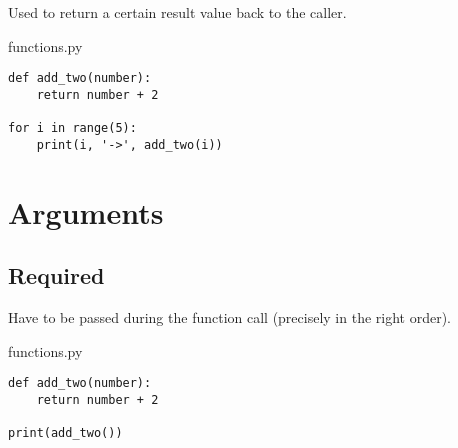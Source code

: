\documentclass[aspectratio=1610,slidestop]{beamer}
\begin{document}
\begin{pframe}
 Used to return a certain result value back to the caller.
 \medskip

 \begin{minipage}[t]{0.47\textwidth}
  \begin{pythonfile}{functions.py}
   \begin{verbatim}
def add_two(number):
    return number + 2

for i in range(5):
    print(i, '->', add_two(i))
   \end{verbatim}
  \end{pythonfile}
 \end{minipage}\qquad
 \pause
 \begin{minipage}[t]{0.47\textwidth}
 \vspace{-3.05cm}
 \begin{terminal}
 \end{terminal}
 \end{minipage}
\end{pframe}



\section{Arguments}

\subsection{Required}
\begin{pframe}
  Have to be passed during the function call (precisely in the right order).
 \begin{pythonfile}{functions.py}
  \begin{verbatim}
def add_two(number):
    return number + 2

print(add_two())
  \end{verbatim}
 \end{pythonfile}
 \pause
 \begin{terminal}
 \end{terminal}
\end{pframe}
\end{document}
